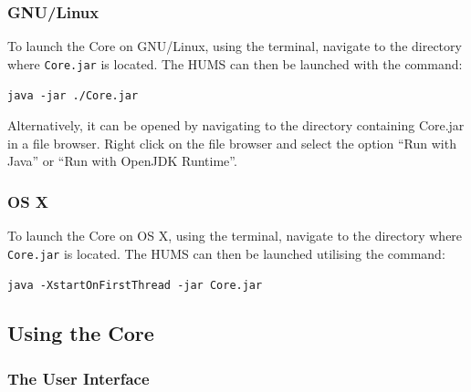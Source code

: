 \documentclass[10pt,a4paper]{article}
\begin{document}
\subsubsection{GNU/Linux}
To launch the Core on GNU/Linux, using the terminal, navigate to the directory where \texttt{Core.jar} is located. The HUMS can then be launched with the command:
\begin{center}
\texttt{java -jar ./Core.jar}
\end{center}
Alternatively, it can be opened by navigating to the directory containing Core.jar in a file browser. Right click on the file browser and select the option ``Run with Java'' or ``Run with OpenJDK Runtime''.

\subsubsection{OS X}
To launch the Core on OS X, using the terminal, navigate to the directory where \texttt{Core.jar} is located. The HUMS can then be launched utilising the command:
\begin{center}
\texttt{java -XstartOnFirstThread -jar Core.jar}
\end{center}

\subsection{Using the Core}
\label{sec:core}

\subsubsection{The User Interface}
\end{document}
